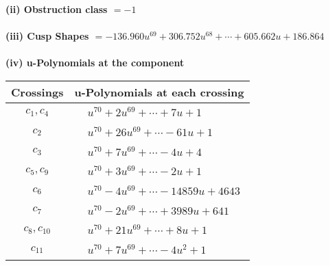 \documentclass[1p]{elsarticle_modified}
\theoremstyle{definition}
\begin{document}
\flushleft \textbf{(ii) Obstruction class $= -1$}\\~\\
\flushleft \textbf{(iii) Cusp Shapes $= -136.960 u^{69}+306.752 u^{68}+\cdots+605.662 u+186.864$}\\~\\
\newpage\renewcommand{\arraystretch}{1}
\flushleft \textbf{(iv) u-Polynomials at the component}\newline \\
\begin{tabular}{m{50pt}|m{274pt}}
Crossings & \hspace{64pt}u-Polynomials at each crossing \\
\hline $$\begin{aligned}c_{1},c_{4}\end{aligned}$$&$\begin{aligned}
&u^{70}+2 u^{69}+\cdots+7 u+1
\end{aligned}$\\
\hline $$\begin{aligned}c_{2}\end{aligned}$$&$\begin{aligned}
&u^{70}+26 u^{69}+\cdots-61 u+1
\end{aligned}$\\
\hline $$\begin{aligned}c_{3}\end{aligned}$$&$\begin{aligned}
&u^{70}+7 u^{69}+\cdots-4 u+4
\end{aligned}$\\
\hline $$\begin{aligned}c_{5},c_{9}\end{aligned}$$&$\begin{aligned}
&u^{70}+3 u^{69}+\cdots-2 u+1
\end{aligned}$\\
\hline $$\begin{aligned}c_{6}\end{aligned}$$&$\begin{aligned}
&u^{70}-4 u^{69}+\cdots-14859 u+4643
\end{aligned}$\\
\hline $$\begin{aligned}c_{7}\end{aligned}$$&$\begin{aligned}
&u^{70}-2 u^{69}+\cdots+3989 u+641
\end{aligned}$\\
\hline $$\begin{aligned}c_{8},c_{10}\end{aligned}$$&$\begin{aligned}
&u^{70}+21 u^{69}+\cdots+8 u+1
\end{aligned}$\\
\hline $$\begin{aligned}c_{11}\end{aligned}$$&$\begin{aligned}
&u^{70}+7 u^{69}+\cdots-4 u^2+1
\end{aligned}$\\
\hline
\end{tabular}\\~\\
\end{document}
